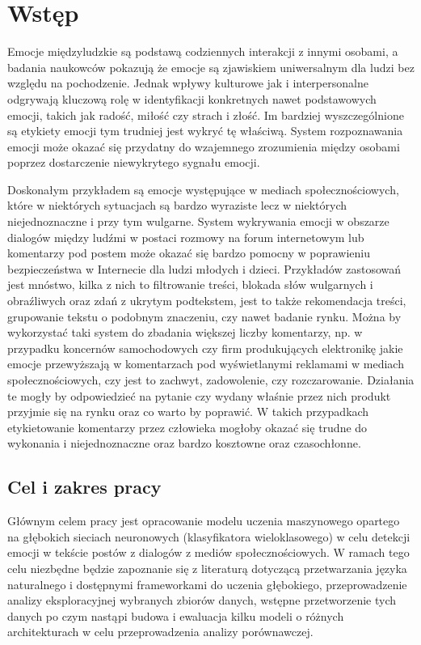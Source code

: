 \chapter{Wstęp}

Emocje międzyludzkie są podstawą codziennych interakcji z innymi osobami, a badania naukowców pokazują że emocje są zjawiskiem uniwersalnym dla ludzi bez względu na pochodzenie. Jednak wpływy kulturowe jak i interpersonalne odgrywają kluczową rolę w identyfikacji konkretnych nawet podstawowych emocji, takich jak radość, miłość czy strach i złość. Im bardziej wyszczególnione są etykiety emocji tym trudniej jest wykryć tę właściwą. System rozpoznawania emocji może okazać się przydatny do wzajemnego zrozumienia między osobami poprzez dostarczenie niewykrytego sygnału emocji. 

Doskonałym przykładem są emocje występujące w mediach społecznościowych, które w niektórych sytuacjach są bardzo wyraziste lecz w niektórych niejednoznaczne i przy tym wulgarne. System wykrywania emocji w obszarze dialogów między ludźmi w postaci rozmowy na forum internetowym lub komentarzy pod postem może okazać się bardzo pomocny w poprawieniu bezpieczeństwa w Internecie dla ludzi młodych i dzieci. Przykładów zastosowań jest mnóstwo, kilka z nich to filtrowanie treści, blokada słów wulgarnych i obraźliwych oraz zdań z ukrytym podtekstem, jest to także rekomendacja treści, grupowanie tekstu o podobnym znaczeniu, czy nawet badanie rynku. Można by wykorzystać taki system do zbadania większej liczby komentarzy, np. w przypadku koncernów samochodowych czy firm produkujących elektronikę jakie emocje przewyższają w komentarzach pod wyświetlanymi reklamami w mediach społecznościowych, czy jest to zachwyt, zadowolenie, czy rozczarowanie. Działania te mogły by odpowiedzieć na pytanie czy wydany właśnie przez nich produkt przyjmie się na rynku oraz co warto by poprawić. W takich przypadkach etykietowanie komentarzy przez człowieka mogłoby okazać się trudne do wykonania i niejednoznaczne oraz bardzo kosztowne oraz czasochłonne.

\section{Cel i zakres pracy}

Głównym celem pracy jest opracowanie modelu uczenia maszynowego opartego na głębokich sieciach neuronowych (klasyfikatora wieloklasowego) w celu detekcji emocji w tekście postów z dialogów z mediów społecznościowych. W ramach tego celu niezbędne będzie zapoznanie się z literaturą  dotyczącą przetwarzania języka naturalnego i dostępnymi frameworkami do uczenia głębokiego, przeprowadzenie analizy eksploracyjnej wybranych zbiorów danych, wstępne przetworzenie tych danych po czym nastąpi budowa i ewaluacja kilku modeli o różnych architekturach w celu przeprowadzenia analizy porównawczej.


